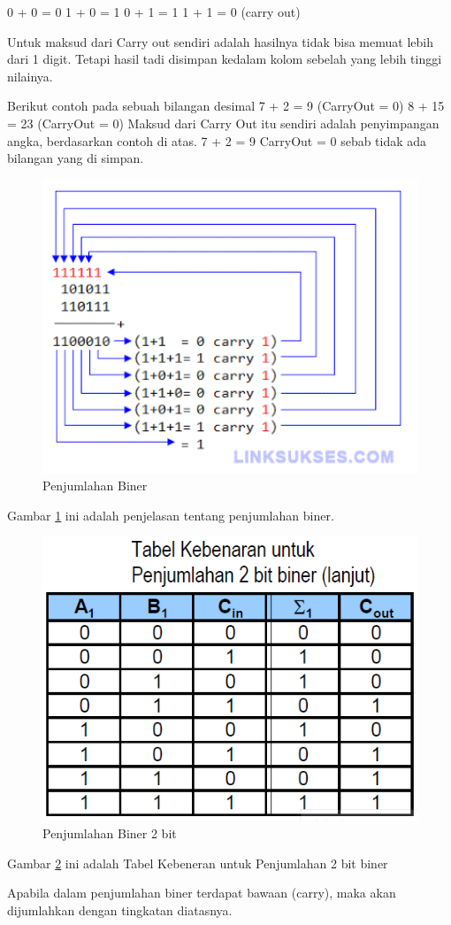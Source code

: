 	0 + 0 = 0
	1 + 0 = 1
	0 + 1 = 1
	1 + 1 = 0 (carry out) 

	Untuk maksud dari Carry out sendiri adalah hasilnya tidak bisa memuat lebih dari 1 digit. Tetapi  hasil tadi disimpan kedalam kolom sebelah yang lebih tinggi nilainya.

	Berikut contoh pada sebuah bilangan desimal
	7 + 2 = 9 (CarryOut = 0)
	8 + 15 = 23 (CarryOut = 0)
	Maksud dari Carry Out itu sendiri adalah penyimpangan angka, berdasarkan contoh di atas. 7 + 2 = 9 CarryOut = 0 sebab tidak ada bilangan yang di simpan. 

		\begin{figure} [ht]
		\centerline{\includegraphics[width=1\textwidth]{figures/Penjumlahan-Biner.gif}}
		\caption{Penjumlahan Biner}
		\label{Penjumlahan-Biner}
		\end{figure}
	Gambar \ref{Penjumlahan-Biner} ini adalah penjelasan tentang penjumlahan biner.

		\begin{figure} [ht]
		\centerline{\includegraphics[width=1\textwidth]{figures/Biner2angka.png}}
		\caption{Penjumlahan Biner 2 bit}
		\label{Biner2angka}
		\end{figure}
	Gambar \ref{Biner2angka} ini adalah Tabel Kebeneran untuk Penjumlahan 2 bit biner

	Apabila dalam penjumlahan biner terdapat bawaan (carry), maka akan dijumlahkan dengan tingkatan diatasnya.

\cite{wang201140}
\cite{brent1970addition}
\cite{detmer2001introduction}
\cite{nurhayati2010aritmatik}
\cite{dosen2013matematika}
